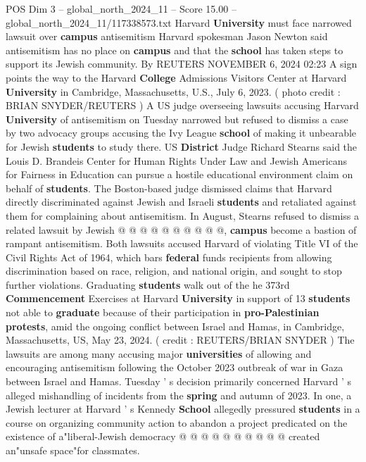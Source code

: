 \begin{textsample}{POS Dim 3 – global\_north\_2024\_11 – Score 15.00 – global\_north\_2024\_11/117338573.txt}  \label{ex:f3_pos_183}
Harvard \textbf{University} must face narrowed lawsuit over \textbf{campus} antisemitism Harvard spokesman Jason Newton said antisemitism has no place on \textbf{campus} and that the \textbf{school} has taken steps to support its Jewish community.
By REUTERS NOVEMBER 6, 2024 02:23 A sign points the way to the Harvard \textbf{College} Admissions Visitors Center at Harvard \textbf{University} in Cambridge, Massachusetts, U.S., July 6, 2023. ( photo credit : BRIAN SNYDER/REUTERS ) A US judge overseeing lawsuits accusing Harvard \textbf{University} of antisemitism on Tuesday narrowed but refused to dismiss a case by two advocacy groups accusing the Ivy League \textbf{school} of making it unbearable for Jewish \textbf{students} to study there.
US \textbf{District} Judge Richard Stearns said the Louis D.
Brandeis Center for Human Rights Under Law and Jewish Americans for Fairness in Education can pursue a hostile educational environment claim on behalf of \textbf{students}.
The Boston-based judge dismissed claims that Harvard directly discriminated against Jewish and Israeli \textbf{students} and retaliated against them for complaining about antisemitism.
In August, Stearns refused to dismiss a related lawsuit by Jewish @ @ @ @ @ @ @ @ @ @, \textbf{campus} become a bastion of rampant antisemitism.
Both lawsuits accused Harvard of violating Title VI of the Civil Rights Act of 1964, which bars \textbf{federal} funds recipients from allowing discrimination based on race, religion, and national origin, and sought to stop further violations.
Graduating \textbf{students} walk out of the he 373rd \textbf{Commencement} Exercises at Harvard \textbf{University} in support of 13 \textbf{students} not able to \textbf{graduate} because of their participation in \textbf{pro-Palestinian} \textbf{protests}, amid the ongoing conflict between Israel and Hamas, in Cambridge, Massachusetts, US, May 23, 2024. ( credit : REUTERS/BRIAN SNYDER ) The lawsuits are among many accusing major \textbf{universities} of allowing and encouraging antisemitism following the October 2023 outbreak of war in Gaza between Israel and Hamas.
Tuesday ' s decision primarily concerned Harvard ' s alleged mishandling of incidents from the \textbf{spring} and autumn of 2023.
In one, a Jewish lecturer at Harvard ' s Kennedy \textbf{School} allegedly pressured \textbf{students} in a course on organizing community action to abandon a project predicated on the existence of a"liberal-Jewish democracy @ @ @ @ @ @ @ @ @ @ created an"unsafe space"for classmates.

\end{textsample}
